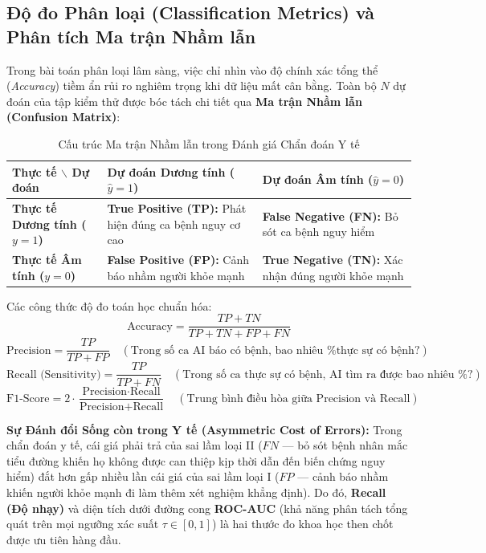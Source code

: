 \documentclass[12pt,a4paper]{report}
\begin{document}
\subsection{Độ đo Phân loại (Classification Metrics) và Phân tích Ma trận Nhầm lẫn}
Trong bài toán phân loại lâm sàng, việc chỉ nhìn vào độ chính xác tổng thể (\textit{Accuracy}) tiềm ẩn rủi ro nghiêm trọng khi dữ liệu mất cân bằng. Toàn bộ $N$ dự đoán của tập kiểm thử được bóc tách chi tiết qua \textbf{Ma trận Nhầm lẫn (Confusion Matrix)}:

\begin{table}[H]
\centering
\small
\begin{tabularx}{\textwidth}{|l|X|X|}
\hline
\textbf{Thực tế $\backslash$ Dự đoán} & \textbf{Dự đoán Dương tính ($\hat{y}=1$)} & \textbf{Dự đoán Âm tính ($\hat{y}=0$)} \\ \hline
\textbf{Thực tế Dương tính ($y=1$)} & \textbf{True Positive (TP):} Phát hiện đúng ca bệnh nguy cơ cao & \textbf{False Negative (FN):} Bỏ sót ca bệnh nguy hiểm \\ \hline
\textbf{Thực tế Âm tính ($y=0$)} & \textbf{False Positive (FP):} Cảnh báo nhầm người khỏe mạnh & \textbf{True Negative (TN):} Xác nhận đúng người khỏe mạnh \\ \hline
\end{tabularx}
\caption{Cấu trúc Ma trận Nhầm lẫn trong Đánh giá Chẩn đoán Y tế}
\label{tab:confusion_matrix_structure}
\end{table}

Các công thức độ đo toán học chuẩn hóa:
\begin{equation}
\text{Accuracy} = \frac{TP + TN}{TP + TN + FP + FN}
\end{equation}
\begin{equation}
\text{Precision} = \frac{TP}{TP + FP} \quad (\text{Trong số ca AI báo có bệnh, bao nhiêu \% thực sự có bệnh?})
\end{equation}
\begin{equation}
\text{Recall (Sensitivity)} = \frac{TP}{TP + FN} \quad (\text{Trong số ca thực sự có bệnh, AI tìm ra được bao nhiêu \%?})
\end{equation}
\begin{equation}
\text{F1-Score} = 2 \cdot \frac{\text{Precision} \cdot \text{Recall}}{\text{Precision} + \text{Recall}} \quad (\text{Trung bình điều hòa giữa Precision và Recall})
\end{equation}

\textbf{Sự Đánh đổi Sống còn trong Y tế (Asymmetric Cost of Errors):}
Trong chẩn đoán y tế, cái giá phải trả của sai lầm loại II ($FN$ — bỏ sót bệnh nhân mắc tiểu đường khiến họ không được can thiệp kịp thời dẫn đến biến chứng nguy hiểm) đắt hơn gấp nhiều lần cái giá của sai lầm loại I ($FP$ — cảnh báo nhầm khiến người khỏe mạnh đi làm thêm xét nghiệm khẳng định). Do đó, \textbf{Recall (Độ nhạy)} và diện tích dưới đường cong \textbf{ROC-AUC} (khả năng phân tách tổng quát trên mọi ngưỡng xác suất $\tau \in [0, 1]$) là hai thước đo khoa học then chốt được ưu tiên hàng đầu.
\end{document}
